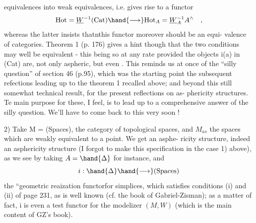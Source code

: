equivalences into weak equivalences,  i.e.  gives rise to a functor
\[ \mathrm{Hot} = \underline{W}^{-1}(\mathrm{Cat}) \hand{\longrightarrow} \mathrm{Hot}_A = \underline{W}_A^{-1}A^{\wedge} \quad , \]
whereas the latter insists thatnthis functor moreover should be an equi-%
valence of categories.   Theorem 1 (p. 176)  gives a hint though that 
the two conditions may well be equivalent  -  this being so at any rate
provided the objects i(a) in (Cat) are,  not only aspheric,  but even
\hand{\uline{\textcolor{black}{contractible}}}.  This reminds us at once  of the ``silly question'' of
section 46  (p.95),  which was the starting point   the subsequent
refections leading up to the theorem 1 recalled above;  and\hand{,}  beyond
this still somewhat technical result,  for the present  reflections on as-%
phericity structures.  Te main purpose for these,  I feel,  is to lead
up to a comprehensive answer of the silly question.  We'll have to come
back to this very soon !

2)   Take  M = (Spaces),  the category of topological spaces,  and
$M_{as}$ the spaces which are weakly equivalent to a point.  We get an asphe-%
ricity structure,  indeed an \hand{\uline{\textcolor{black}{aspheric}}} asphericity structure (I forgot to
make this  specification  in the case  1) above),  as we see by
taking  $A = \hand{\Delta}$ for instance,  and
\[ i: \hand{\Delta} \hand{\longrightarrow} (\mathrm{Spaces}) \]
the ``geometric reaization functorfor simplices,  which satisfies
conditions (i) and (ii) of page 231,  as is well known (cf. the book of
Gabriel-Zisman);  as a matter of fact,  i is even a test functor for
the modelizer $(M,W)$ (which is  the main content of GZ's book).

